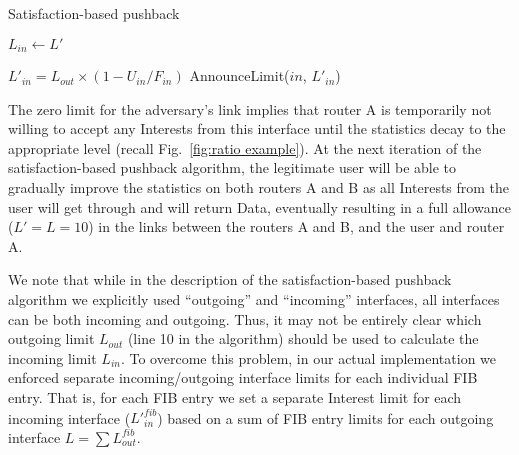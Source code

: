 { 
\begin{algorithm}[h]
\footnotesize
\caption{\small Satisfaction-based pushback}
\label{alg:dynamic limits}
\begin{algorithmic}[1]
\State{} 
\vspace{0.1cm}
  

\vspace{0.1cm}

\State{} 
    \State $L_{in} \leftarrow L'$
\EndFunction

\vspace{0.1cm}

 

        \State $L'_{in}= {L_{out}} \times (1 - U_{in}/F_{in})$
        \State AnnounceLimit($in$, $L'_{in}$)
   \EndFor

\EndFor
\EndFunction

\end{algorithmic}
\end{algorithm}


The zero limit for the adversary's link implies that  router A is temporarily not willing to accept any Interests from this interface until the statistics decay to the appropriate level (recall Fig.~\ref{fig:ratio example}).
At the next iteration of the satisfaction-based pushback algorithm, the legitimate user will be able to gradually improve the statistics on both routers A and B as all Interests from the user will get through and will return Data, eventually resulting in a full allowance ($L'=L=10$) in the links between the routers A and B, and the user and router A.

We note that while in the description of the satisfaction-based pushback algorithm we explicitly used ``outgoing'' and ``incoming'' interfaces,  all interfaces can be both incoming and outgoing.
Thus, it may not be entirely clear which outgoing limit $L_{out}$ (line 10 in the algorithm) should be used to calculate the incoming limit $L_{in}$.
To overcome this problem, in our actual implementation we enforced separate incoming/outgoing interface limits for each individual FIB entry.
That is, for each FIB entry we set a separate Interest limit for each incoming interface (${L'}_{in}^{fib}$) based on a sum of FIB entry limits for each outgoing interface $L=\sum{L_{out}^{fib}}$.


}
